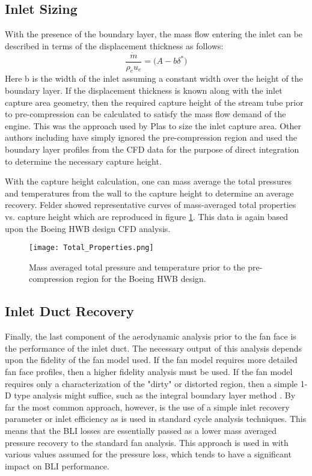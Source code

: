 		\subsection{Inlet Sizing}
			With the presence of the boundary layer, the mass flow entering the inlet can be described in terms of the displacement thickness as follows:
			\begin{equation}
				\frac{\dot{m}}{\rho_eu_e} = \Big(A - b\delta^*\Big)
            \end{equation}%
			Here b is the width of the inlet assuming a constant width over the height of the boundary layer.  If the displacement thickness is known along with the inlet capture area geometry, then the required capture height of the stream tube prior to pre-compression can be calculated to satisfy the mass flow demand of the engine.  This was the approach used by Plas \cite{PlasThesis} to size the inlet capture area.  Other authors including \cite{Felder2012} have simply ignored the pre-compression region and used the boundary layer profiles from the CFD data for the purpose of direct integration to determine the necessary capture height.
			
			With the capture height calculation, one can mass average the total pressures and temperatures from the wall to the capture height to determine an average recovery.  Felder showed representative curves of mass-averaged total properties vs. capture height which are reproduced in figure \ref{Total_Properties}.  This data is again based upon the Boeing HWB design CFD analysis.
			\begin{figure}[htpb]
				\centering
				\texttt{[image: Total\_Properties.png]}
				\vspace{-25pt}
				\caption{Mass averaged total pressure and temperature prior to the pre-compression region for the Boeing HWB design.}
				\label{Total_Properties}
			\end{figure}
		\subsection{Inlet Duct Recovery}
			Finally, the last component of the aerodynamic analysis prior to the fan face is the performance of the inlet duct.  The necessary output of this analysis depends upon the fidelity of the fan model used.  If the fan model requires more detailed fan face profiles, then a higher fidelity analysis must be used.  If the fan model requires only a characterization of the "dirty" or distorted region, then a simple 1-D type analysis might suffice, such as the integral boundary layer method \cite{PlasThesis}.  By far the most common approach, however, is the use of a simple inlet recovery parameter or inlet efficiency as is used in standard cycle analysis techniques.  This means that the BLI losses are essentially passed as a lower mass averaged pressure recovery to the standard fan analysis.  This approach is used in \cite{Felder2011} \cite{Sato2011} \cite{Hardin2012} \cite{Nickol2009}  with various values assumed for the pressure loss, which tends to have a significant impact on BLI performance.

